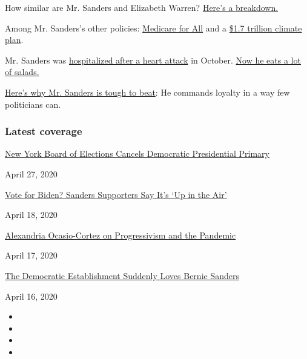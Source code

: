How similar are Mr. Sanders and Elizabeth Warren?
\href{https://www.nytimes.com/2019/07/30/us/politics/elizabeth-warren-bernie-sanders.html}{Here's
a breakdown.}

Among Mr. Sanders's other policies:
\href{https://www.nytimes.com/2019/03/23/health/private-health-insurance-medicare-for-all-bernie-sanders.html}{Medicare
for All} and a
\href{https://www.nytimes.com/2019/08/22/climate/bernie-sanders-climate-change.html}{\$1.7
trillion climate plan}.

Mr. Sanders was
\href{https://www.nytimes.com/2019/10/04/us/politics/bernie-sanders-hospital.html}{hospitalized
after a heart attack} in October.
\href{https://www.nytimes.com/2019/11/13/us/politics/bernie-sanders-heart-attack.html}{Now
he eats a lot of salads.}

\href{https://www.nytimes.com/2019/12/26/us/politics/bernie-sanders-iowa-democrats.html}{Here's
why Mr. Sanders is tough to beat}: He commands loyalty in a way few
politicians can.

\hypertarget{latest-coverage}{%
\subsubsection{Latest coverage}\label{latest-coverage}}

\href{https://www.nytimes.com/2020/04/27/us/politics/democratic-primary-canceled-coronavirus.html}{New
York Board of Elections Cancels Democratic Presidential Primary}

April 27, 2020

\href{https://www.nytimes.com/2020/04/18/us/politics/bernie-sanders-voters-biden.html}{Vote
for Biden? Sanders Supporters Say It's `Up in the Air'}

April 18, 2020

\href{https://www.nytimes.com/2020/04/17/podcasts/the-daily/alexandria-ocasio-cortez-coronavirus.html}{Alexandria
Ocasio-Cortez on Progressivism and the Pandemic}

April 17, 2020

\href{https://www.nytimes.com/2020/04/16/us/politics/bernie-sanders-joe-biden-democrats.html}{The
Democratic Establishment Suddenly Loves Bernie Sanders}

April 16, 2020

\begin{itemize}
\item
\item
\item
\item
\end{itemize}

